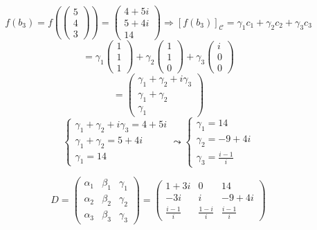 \documentclass[a4paper]{article}
\theoremstyle{break}
\theoremstyle{break}
\theoremstyle{break}
\theoremstyle{break}
\begin{document}
\begin{enumerate}
	      \vspace{1em}
	      \[
		      f(b_3) = f \left( \begin{pmatrix} 5\\4\\3 \end{pmatrix}  \right) =
		      \begin{pmatrix}
			      4 + 5i \\
			      5 + 4i \\
			      14
		      \end{pmatrix}
		      \Rightarrow
		      [f(b_3)]_{\mathcal{C}} = \gamma_1 c_1 + \gamma_2 c_2 + \gamma_3 c_3
	      \]
	      \[
		      = \gamma_1 \begin{pmatrix} 1\\1\\1 \end{pmatrix}
		      + \gamma_2 \begin{pmatrix} 1\\1\\0 \end{pmatrix}
		      + \gamma_3 \begin{pmatrix} i\\0\\0 \end{pmatrix}
	      \]
	      \[
		      = \begin{pmatrix}
			      \gamma_1 + \gamma_2 + i\gamma_3 \\
			      \gamma_1 + \gamma_2             \\
			      \gamma_1
		      \end{pmatrix}
	      \]
	      \[
		      \begin{cases}
			      \gamma_1 + \gamma_2 + i\gamma_3 = 4+5i \\
			      \gamma_1 + \gamma_2 = 5+4i             \\
			      \gamma_1 = 14
		      \end{cases}
		      \leadsto
		      \begin{cases}
			      \gamma_1 = 14      \\
			      \gamma_2 = -9 + 4i \\
			      \gamma_3 = \frac{i-1}{i}
		      \end{cases}
	      \]

	      \vspace{1em}
	      \[
		      D = \begin{pmatrix}
			      \alpha_1 & \beta_1 & \gamma_1 \\
			      \alpha_2 & \beta_2 & \gamma_2 \\
			      \alpha_3 & \beta_3 & \gamma_3
		      \end{pmatrix}
		      =
		      \begin{pmatrix}
			      1+3i          & 0             & 14            \\
			      -3i           & i             & -9+4i         \\
			      \frac{i-1}{i} & \frac{1-i}{i} & \frac{i-1}{i}
		      \end{pmatrix}
	      \]


\end{enumerate}
\end{document}

